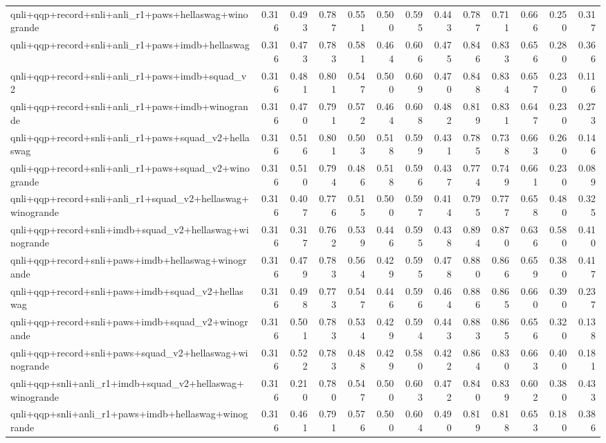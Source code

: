 \begin{table}[t]
\begin{tabular}{lrrrrrrrrrrrr}
    qnli+qqp+record+snli+anli\_r1+paws+hellaswag+winogrande & 0.316 & 0.493 & 0.787 & 0.551 & 0.500 & 0.595 & 0.443 & 0.787 & 0.711 & 0.666 & 0.250 & 0.317 \\
    qnli+qqp+record+snli+anli\_r1+paws+imdb+hellaswag & 0.316 & 0.473 & 0.783 & 0.581 & 0.464 & 0.606 & 0.475 & 0.846 & 0.833 & 0.656 & 0.280 & 0.366 \\
    qnli+qqp+record+snli+anli\_r1+paws+imdb+squad\_v2 & 0.316 & 0.481 & 0.801 & 0.547 & 0.500 & 0.609 & 0.470 & 0.848 & 0.834 & 0.657 & 0.230 & 0.116 \\
    qnli+qqp+record+snli+anli\_r1+paws+imdb+winogrande & 0.316 & 0.470 & 0.791 & 0.572 & 0.464 & 0.608 & 0.482 & 0.819 & 0.831 & 0.647 & 0.230 & 0.273 \\
    qnli+qqp+record+snli+anli\_r1+paws+squad\_v2+hellaswag & 0.316 & 0.516 & 0.801 & 0.503 & 0.518 & 0.599 & 0.431 & 0.785 & 0.738 & 0.663 & 0.260 & 0.146 \\
    qnli+qqp+record+snli+anli\_r1+paws+squad\_v2+winogrande & 0.316 & 0.510 & 0.794 & 0.486 & 0.518 & 0.596 & 0.437 & 0.774 & 0.749 & 0.661 & 0.230 & 0.089 \\
    qnli+qqp+record+snli+anli\_r1+squad\_v2+hellaswag+winogrande & 0.316 & 0.407 & 0.776 & 0.515 & 0.500 & 0.597 & 0.414 & 0.795 & 0.777 & 0.658 & 0.480 & 0.325 \\
    qnli+qqp+record+snli+imdb+squad\_v2+hellaswag+winogrande & 0.316 & 0.317 & 0.762 & 0.539 & 0.446 & 0.595 & 0.438 & 0.894 & 0.870 & 0.636 & 0.580 & 0.410 \\
    qnli+qqp+record+snli+paws+imdb+hellaswag+winogrande & 0.316 & 0.479 & 0.783 & 0.564 & 0.429 & 0.595 & 0.478 & 0.880 & 0.866 & 0.659 & 0.380 & 0.417 \\
    qnli+qqp+record+snli+paws+imdb+squad\_v2+hellaswag & 0.316 & 0.498 & 0.773 & 0.547 & 0.446 & 0.596 & 0.464 & 0.886 & 0.865 & 0.660 & 0.390 & 0.237 \\
    qnli+qqp+record+snli+paws+imdb+squad\_v2+winogrande & 0.316 & 0.501 & 0.783 & 0.534 & 0.429 & 0.594 & 0.443 & 0.883 & 0.865 & 0.656 & 0.320 & 0.138 \\
    qnli+qqp+record+snli+paws+squad\_v2+hellaswag+winogrande & 0.316 & 0.522 & 0.783 & 0.488 & 0.429 & 0.580 & 0.422 & 0.864 & 0.830 & 0.663 & 0.400 & 0.181 \\
    qnli+qqp+snli+anli\_r1+imdb+squad\_v2+hellaswag+winogrande & 0.316 & 0.210 & 0.780 & 0.547 & 0.500 & 0.603 & 0.472 & 0.840 & 0.839 & 0.602 & 0.380 & 0.433 \\
    qnli+qqp+snli+anli\_r1+paws+imdb+hellaswag+winogrande & 0.316 & 0.461 & 0.791 & 0.576 & 0.500 & 0.604 & 0.490 & 0.819 & 0.818 & 0.653 & 0.180 & 0.386 \\

\end{tabular}
\end{table}
